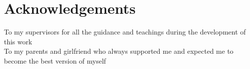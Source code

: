 \chapter*{Acknowledgements}

To my supervisors for all the guidance and teachings during the development of this work \\
To my parents and girlfriend who always supported me and expected me to become the best version of myself \\

\vspace{10mm}
